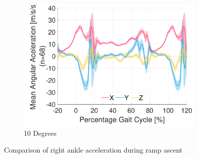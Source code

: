 \begin{figure}[!p]
\begin{subfigure}[b]{0.3\textwidth}
        \includegraphics[width=\textwidth]{content/3-Methods/ramp/ch3_ramp_10_degree_activity_ramp_up_accel_r_ankle.pdf}
        \caption{10 Degrees}
    \end{subfigure}
    \caption{Comparison of right ankle acceleration during ramp ascent}
    \label{fig:ramp_up_accel_comparison}
\end{figure}


